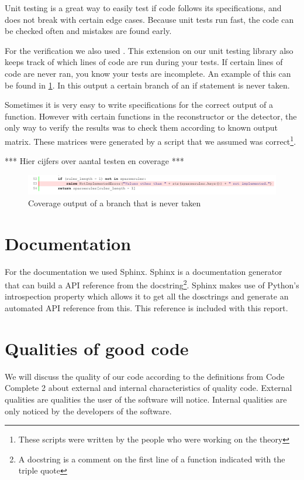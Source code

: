 \documentclass[a4paper, openany, oneside]{memoir}
\begin{document}
Unit testing is a great way to easily test if code follows its specifications, and does not break with certain edge cases. Because unit tests run fast, the code can be checked often and mistakes are found early.

For the verification we also used . This extension on our unit testing library also keeps track of which lines of code are run during your tests. If certain lines of code are never ran, you know your tests are incomplete. An example of this can be found in \cref{fig:coverage_branch}. In this output a certain branch of an if statement is never taken.

Sometimes it is very easy to write specifications for the correct output of a function. However with certain functions in the reconstructor or the detector, the only way to verify the results was to check them according to known output matrix. These matrices were generated by a \matlab{} script that we assumed was correct\footnote{These \matlab{} scripts were written by the people who were working on the theory}.

*** Hier cijfers over aantal testen en coverage ***

\begin{figure}[h]
    \centering
    \includegraphics[width=\textwidth]{fig_branch_coverage.pdf}
    \caption{Coverage output of a branch that is never taken}
    \label{fig:coverage_branch}
\end{figure}

\section{Documentation}
\label{sec:documentation}
For the documentation we used Sphinx. Sphinx is a documentation generator that can build a API reference from the docstring\footnote{A docstring is a comment on the first line of a function indicated with the triple quote}. Sphinx makes use of Python's introspection property which allows it to get all the dosctrings and generate an automated API reference from this. This reference is included with this report.

\section{Qualities of good code}
We will discuss the quality of our code according to the definitions from Code Complete 2 about external and internal characteristics of quality code. External qualities are qualities the user of the software will notice. Internal qualities are only noticed by the developers of the software.\cite{mcconnell2004code}
\end{document}
